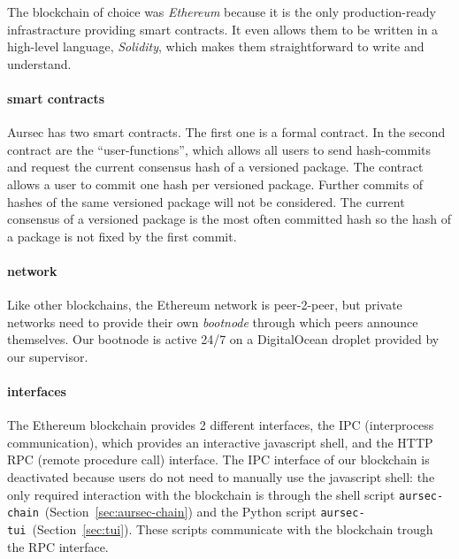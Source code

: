 The blockchain of choice was \emph{Ethereum} because it is the only production-ready infrastracture providing smart contracts. It even allows them to be written in a high-level language, \emph{Solidity}, which makes them straightforward to write and understand.

\paragraph*{smart contracts}
Aursec has two smart contracts. The first one is a formal contract. In the second contract are the ``user-functions'', which allows all users to send hash-commits and request the current consensus hash of a versioned package. The contract allows a user to commit one hash per versioned package. Further commits of hashes of the same versioned package will not be considered. The current consensus of a versioned package is the most often committed hash so the hash of a package is not fixed by the first commit.

\paragraph*{network}
Like other blockchains, the Ethereum network is peer-2-peer, but private networks need to provide their own \emph{bootnode} through which peers announce themselves. Our bootnode is active 24/7 on a DigitalOcean droplet provided by our supervisor.

\paragraph*{interfaces}
The Ethereum blockchain provides 2 different interfaces, the IPC (interprocess communication), which provides an interactive javascript shell, and the HTTP RPC (remote procedure call) interface. The IPC interface of our blockchain is deactivated because users do not need to manually use the javascript shell: the only required interaction with the blockchain is through the shell script \texttt{aursec-chain}~(Section~\ref{sec:aursec-chain}) and the Python script \texttt{aursec-tui}~(Section~\ref{sec:tui}). These scripts communicate with the blockchain trough the RPC interface.
